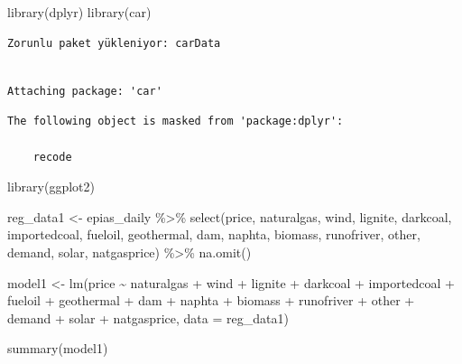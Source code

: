 \documentclass[
]{article}
\newenvironment{Shaded}{\begin{snugshade}}{\end{snugshade}}
\newcommand{\AttributeTok}[1]{\textcolor[rgb]{0.40,0.45,0.13}{#1}}
\newcommand{\FunctionTok}[1]{\textcolor[rgb]{0.28,0.35,0.67}{#1}}
\newcommand{\NormalTok}[1]{\textcolor[rgb]{0.00,0.23,0.31}{#1}}
\newcommand{\OtherTok}[1]{\textcolor[rgb]{0.00,0.23,0.31}{#1}}
\newcommand{\SpecialCharTok}[1]{\textcolor[rgb]{0.37,0.37,0.37}{#1}}
\begin{document}
\begin{Shaded}
\begin{Highlighting}[]
\FunctionTok{library}\NormalTok{(dplyr)}
\FunctionTok{library}\NormalTok{(car)}
\end{Highlighting}
\end{Shaded}

\begin{verbatim}
Zorunlu paket yükleniyor: carData
\end{verbatim}

\begin{verbatim}

Attaching package: 'car'
\end{verbatim}

\begin{verbatim}
The following object is masked from 'package:dplyr':

    recode
\end{verbatim}

\begin{Shaded}
\begin{Highlighting}[]
\FunctionTok{library}\NormalTok{(ggplot2)}

\NormalTok{reg\_data1 }\OtherTok{\textless{}{-}}\NormalTok{ epias\_daily }\SpecialCharTok{\%\textgreater{}\%}
  \FunctionTok{select}\NormalTok{(price, naturalgas, wind, lignite, darkcoal, importedcoal, fueloil, geothermal, dam, naphta, biomass, runofriver, other, demand, solar, natgasprice) }\SpecialCharTok{\%\textgreater{}\%}
  \FunctionTok{na.omit}\NormalTok{()}

\NormalTok{model1 }\OtherTok{\textless{}{-}} \FunctionTok{lm}\NormalTok{(price }\SpecialCharTok{\textasciitilde{}}\NormalTok{ naturalgas }\SpecialCharTok{+}\NormalTok{ wind }\SpecialCharTok{+}\NormalTok{ lignite }\SpecialCharTok{+}\NormalTok{ darkcoal }\SpecialCharTok{+}\NormalTok{ importedcoal }\SpecialCharTok{+}\NormalTok{ fueloil }\SpecialCharTok{+}\NormalTok{ geothermal }\SpecialCharTok{+}\NormalTok{ dam }\SpecialCharTok{+}\NormalTok{ naphta }\SpecialCharTok{+}\NormalTok{ biomass }\SpecialCharTok{+}\NormalTok{ runofriver }\SpecialCharTok{+}\NormalTok{ other }\SpecialCharTok{+}\NormalTok{ demand }\SpecialCharTok{+}\NormalTok{ solar }\SpecialCharTok{+}\NormalTok{ natgasprice, }\AttributeTok{data =}\NormalTok{ reg\_data1)}

\FunctionTok{summary}\NormalTok{(model1)}
\end{Highlighting}
\end{Shaded}
\end{document}
